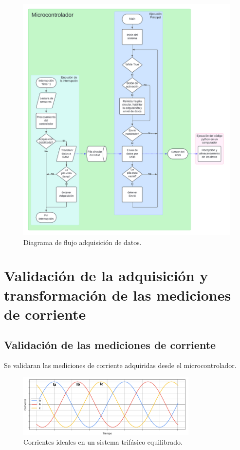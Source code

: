 \documentclass[11pt]{report}
\begin{document}
\begin{figure}[ht]
	\centering
	\includegraphics[width=\textwidth]{imagenes/Debug USB.png}
	\caption{Diagrama de flujo adquisición de datos.}
	\label{flujo_debug}
\end{figure}
\FloatBarrier

\section{Validación de la adquisición y transformación de las mediciones de corriente}

\subsection{Validación de las mediciones de corriente}
Se validaran las mediciones de corriente adquiridas desde el microcontrolador.

\begin{figure}[ht]
	\centering
	\includegraphics[width=0.8\textwidth]{imagenes/Corrientes_ABC_ideal.png}
	\caption{Corrientes ideales en un sistema trifásico equilibrado.}
	\label{corrientes_ABC_ideal}
\end{figure}
\FloatBarrier
\end{document}
